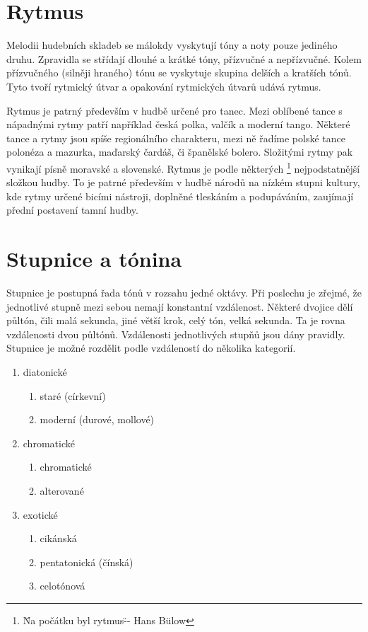 \section{Rytmus}
Melodii hudebních skladeb se málokdy vyskytují tóny a noty pouze jediného druhu.
Zpravidla se střídají dlouhé a krátké tóny, přízvučné a nepřízvučné.
Kolem přízvučného (silněji hraného) tónu se vyskytuje skupina delších a kratších tónů.
Tyto tvoří rytmický útvar a opakování rytmických útvarů udává rytmus.
\par
Rytmus je patrný především v hudbě určené pro tanec.
Mezi oblíbené tance s nápadnými rytmy patří například česká polka,
valčík a moderní tango. 
Některé tance a rytmy jsou spíše regionálního charakteru, 
mezi ně řadíme polské tance polonéza a mazurka, maďarský čardáš, či španělské bolero.
Složitými rytmy pak vynikají písně moravské a slovenské.
Rytmus je podle některých
\footnote{\"Na počátku byl rytmus\" -- Hans Bülow} 
nejpodstatnější složkou hudby.
To je patrné především v hudbě národů na nízkém stupni kultury,
kde rytmy určené bicími nástroji, doplněné tleskáním a podupáváním,
zaujímají přední postavení tamní hudby.
\cite{cmiral}

\section{Stupnice a tónina}

Stupnice je postupná řada tónů v rozsahu jedné oktávy.
Při poslechu je zřejmé, že jednotlivé stupně mezi sebou nemají konstantní vzdálenost.
\cite{kofron}
Některé dvojice dělí půltón, čili malá sekunda, 
jiné větší krok, celý tón, velká sekunda.
Ta je rovna vzdálenosti dvou půltónů.
Vzdálenosti jednotlivých stupňů jsou dány pravidly.
\cite{cmiral}
Stupnice je možné rozdělit podle vzdáleností do několika kategorií.

\begin{enumerate}
	\item diatonické
	\begin{enumerate}
        \item staré (církevní)
        \item moderní (durové, mollové)
    \end{enumerate}
	\item chromatické
	\begin{enumerate}
        \item chromatické
        \item alterované
    \end{enumerate}
	\item exotické
	\begin{enumerate}
        \item cikánská
        \item pentatonická (čínská)
        \item celotónová
    \end{enumerate}
\end{enumerate}


